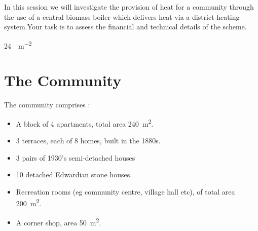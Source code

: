 \documentclass[parskip=half]{scrartcl}
\begin{document}
In this session we will investigate the provision of heat for a community through the use of a central biomass boiler which delivers heat via a district heating system.Your task is to assess the financial and technical details of the scheme.

\SI{24}{\kWhr\per\metre\squared}

\section{The Community}

The community comprises :
\begin{itemize}
\item A block of 4 apartments, total area \SI{240}{\metre\squared}.
\item 3 terraces, each of 8 homes, built in the 1880s.
\item 3 pairs of 1930's semi-detached houses
\item 10 detached Edwardian stone houses.
\item Recreation rooms (eg community centre, village hall etc), of total area \SI{200}{\metre\squared}.
\item A corner shop, area \SI{50}{\metre\squared}.
\end{itemize}
\end{document}
